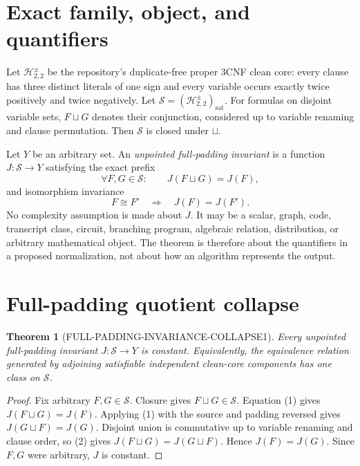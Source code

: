\documentclass[11pt]{article}
\newtheorem{theorem}{Theorem}
\begin{document}
\section{Exact family, object, and quantifiers}

Let \(\mathcal H_{2,2}^{\pm}\) be the repository's duplicate-free proper
3CNF clean core: every clause has three distinct literals of one sign and
every variable occurs exactly twice positively and twice negatively.  Let
\(\mathcal S=(\mathcal H_{2,2}^{\pm})_{\mathrm{sat}}\).  For formulas on
disjoint variable sets, \(F\sqcup G\) denotes their conjunction, considered
up to variable renaming and clause permutation.  Then \(\mathcal S\) is
closed under \(\sqcup\).

Let \(Y\) be an arbitrary set.  An \emph{unpointed full-padding invariant}
is a function \(J:\mathcal S\to Y\) satisfying the exact prefix
\[
 \forall F,G\in\mathcal S:\qquad J(F\sqcup G)=J(F),                 \tag{1}
\]
and isomorphism invariance
\[
 F\cong F'\quad\Longrightarrow\quad J(F)=J(F').                    \tag{2}
\]
No complexity assumption is made about \(J\).  It may be a scalar, graph,
code, transcript class, circuit, branching program, algebraic relation,
distribution, or arbitrary mathematical object.  The theorem is therefore
about the quantifiers in a proposed normalization, not about how an algorithm
represents the output.

\section{Full-padding quotient collapse}

\begin{theorem}[FULL-PADDING-INVARIANCE-COLLAPSE1]
\label{thm:collapse}
Every unpointed full-padding invariant \(J:\mathcal S\to Y\) is constant.
Equivalently, the equivalence relation generated by adjoining satisfiable
independent clean-core components has one class on \(\mathcal S\).
\end{theorem}

\begin{proof}
Fix arbitrary \(F,G\in\mathcal S\).  Closure gives
\(F\sqcup G\in\mathcal S\).  Equation (1) gives
\(J(F\sqcup G)=J(F)\).  Applying (1) with the source and padding reversed
gives \(J(G\sqcup F)=J(G)\).  Disjoint union is commutative up to variable
renaming and clause order, so (2) gives
\(J(F\sqcup G)=J(G\sqcup F)\).  Hence \(J(F)=J(G)\).  Since \(F,G\) were
arbitrary, \(J\) is constant.
\end{proof}
\end{document}
